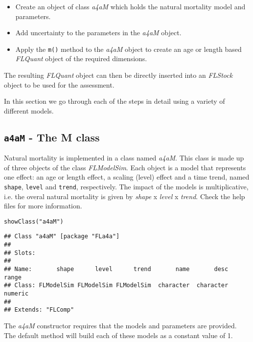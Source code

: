 \documentclass[a4paper,english,10pt]{article}\usepackage[]{graphicx}\usepackage[]{color}
\makeatletter
\newcommand{\hlstr}[1]{\textcolor[rgb]{0.2,0.2,0.2}{#1}}%
\newcommand{\hlstd}[1]{\textcolor[rgb]{0,0,0}{#1}}%
\newcommand{\hlkwd}[1]{\textcolor[rgb]{0.361,0.506,0.596}{#1}}%
\newenvironment{kframe}{%
 \def\at@end@of@kframe{}%
 \ifinner\ifhmode%
  \def\at@end@of@kframe{\end{minipage}}%
  \begin{minipage}{\columnwidth}%
 \fi\fi%
 \def\FrameCommand##1{\hskip\@totalleftmargin \hskip-\fboxsep
 \colorbox{shadecolor}{##1}\hskip-\fboxsep
     \hskip-\linewidth \hskip-\@totalleftmargin \hskip\columnwidth}%
 \MakeFramed {\advance\hsize-\width
   \@totalleftmargin\z@ \linewidth\hsize
   \@setminipage}}%
 {\par\unskip\endMakeFramed%
 \at@end@of@kframe}
\newenvironment{knitrout}{}{} %
\newcommand{\code}[1]{{\texttt{#1}}}
\newcommand{\class}[1]{{\textit{#1}}}
\makeatother
\begin{document}
\begin{itemize}
    \item Create an object of class \class{a4aM} which holds the natural mortality model and parameters.
    \item Add uncertainty to the parameters in the \class{a4aM} object.
    \item Apply the \code{m()} method to the \class{a4aM} object to create an age or length based \class{FLQuant} object of the required dimensions.
\end{itemize}

The resulting \class{FLQuant} object can then be directly inserted into an \class {FLStock} object to be used for the assessment.   

In this section we go through each of the steps in detail using a variety of different models.

\subsection{\code{a4aM} - The M class}

Natural mortality is implemented in a class named \class{a4aM}. This class is made up of three objects of the class \class{FLModelSim}. Each object is a model that represents one effect: an age or length effect, a scaling (level) effect and a time trend, named \code{shape}, \code{level} and \code{trend}, respectively. The impact of the models is multiplicative, i.e. the overal natural mortality is given by \class{shape} x  \class{level} x \class{trend}. Check the help files for more information.

\begin{knitrout}
\color{fgcolor}\begin{kframe}
\begin{alltt}
\hlkwd{showClass}\hlstd{(}\hlstr{"a4aM"}\hlstd{)}
\end{alltt}
\begin{verbatim}
## Class "a4aM" [package "FLa4a"]
## 
## Slots:
##                                                                         
## Name:       shape      level      trend       name       desc      range
## Class: FLModelSim FLModelSim FLModelSim  character  character    numeric
## 
## Extends: "FLComp"
\end{verbatim}
\end{kframe}
\end{knitrout}

The \class{a4aM} constructor requires that the models and parameters are provided. The default method will build each of these models as a constant value of 1.
\end{document}
